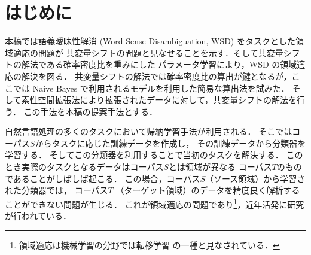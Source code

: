 \documentclass[japanese]{jnlp_1.4}
\begin{document}
\maketitle


\section{はじめに}

本稿では語義曖昧性解消 (Word Sense Disambiguation, WSD) をタスクとした領域適応の問題が
共変量シフトの問題と見なせることを示す．そして共変量シフトの解法である確率密度比を重みにした
パラメータ学習により，WSD の領域適応の解決を図る．
共変量シフトの解法では確率密度比の算出が鍵となるが，ここでは Naive
Bayes で利用されるモデルを利用した簡易な算出法を試みた．
そして素性空間拡張法により拡張されたデータに対して，共変量シフトの解法を行う．
この手法を本稿の提案手法とする．

自然言語処理の多くのタスクにおいて帰納学習手法が利用される．
そこではコーパス\( S \)からタスクに応じた訓練データを作成し，
その訓練データから分類器を学習する．
そしてこの分類器を利用することで当初のタスクを解決する．
このとき実際のタスクとなるデータはコーパス\( S \)とは領域が異なる
コーパス\( T \)のものであることがしばしば起こる．
この場合，コーパス\( S \)（ソース領域）から学習された分類器では，
コーパス\( T \) （ターゲット領域）のデータを精度良く解析することができない問題が生じる．
これが領域適応の問題であり\footnote{領域適応は機械学習の分野では転移学習
\cite{kamishima}の一種と見なされている．}，近年活発に研究が行われている\cite{da-book}．
\end{document}
